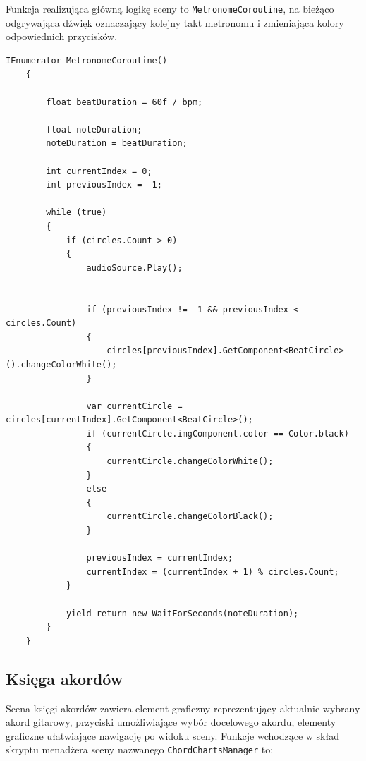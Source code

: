 Funkcja realizująca główną logikę sceny to \texttt{MetronomeCoroutine}, na bieżąco odgrywająca dźwięk oznaczający kolejny takt metronomu i zmieniająca kolory odpowiednich przycisków.

\begin{lstlisting}[style=sharpcstyle,caption=Wątek \texttt{MetronomeCoroutine}, label=lst:2]
    IEnumerator MetronomeCoroutine()
    {
        
        float beatDuration = 60f / bpm;

        float noteDuration;
        noteDuration = beatDuration;

        int currentIndex = 0;
        int previousIndex = -1;

        while (true)
        {
            if (circles.Count > 0)
            {
                audioSource.Play();
                
           
                if (previousIndex != -1 && previousIndex < circles.Count)
                {
                    circles[previousIndex].GetComponent<BeatCircle>().changeColorWhite();
                }
                
                var currentCircle = circles[currentIndex].GetComponent<BeatCircle>();
                if (currentCircle.imgComponent.color == Color.black)
                {
                    currentCircle.changeColorWhite();
                }
                else
                {
                    currentCircle.changeColorBlack();
                }

                previousIndex = currentIndex;
                currentIndex = (currentIndex + 1) % circles.Count;
            }
            
            yield return new WaitForSeconds(noteDuration);
        }
    }
\end{lstlisting}

\subsection{Księga akordów}

Scena księgi akordów zawiera element graficzny reprezentujący aktualnie wybrany akord gitarowy, przyciski umożliwiające wybór docelowego akordu, elementy graficzne ułatwiające nawigację po widoku sceny. Funkcje wchodzące w skład skryptu menadżera sceny nazwanego \texttt{ChordChartsManager} to:

